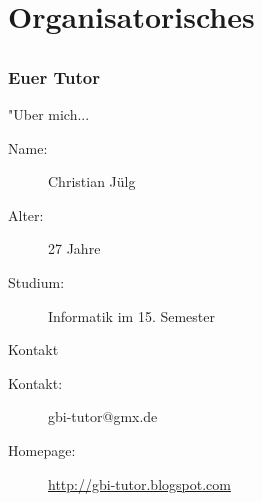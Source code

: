 













\section[Organisation]{Organisatorisches}
\subsection*{}
\begin{frame}
\frametitle{Euer Tutor}
        \begin{block}{"Uber mich...}
                \begin{description}
                        \item[Name:] Christian Jülg
                        \item[Alter:] 27 Jahre
                        \item[Studium:] Informatik im 15. Semester
                \end{description}
        \end{block}

        \vspace{2ex}

        \begin{block}{Kontakt}
                \begin{description}
                        \item[Kontakt:] gbi-tutor@gmx.de
                        \item[Homepage:] \url{http://gbi-tutor.blogspot.com}
                \end{description}
        \end{block}
\end{frame}

